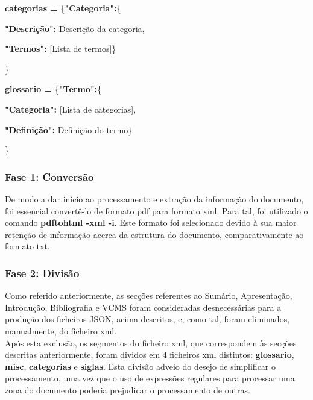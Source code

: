 \begin{center}
    \textbf{categorias =}
    \{\textbf{"Categoria":}\{
\end{center}
\begin{center}
    \textbf{"Descrição":}
    {Descrição da categoria},
\end{center}
\begin{center}
    \textbf{"Termos":}
    {[Lista de termos]}\}
\end{center}
\}

\begin{center}
    \textbf{glossario =}
    \{\textbf{"Termo":}\{
\end{center}
\begin{center}
    \textbf{"Categoria":}
    {[Lista de categorias]},
\end{center}
\begin{center}
    \textbf{"Definição":}
    {Definição do termo}\}
\end{center}
\}

\subsubsection{Fase 1: Conversão}

De modo a dar início ao processamento e extração da informação do documento, foi essencial convertê-lo de formato pdf para formato xml. Para tal, foi utilizado o comando \textbf{pdftohtml -xml -i}. Este formato foi selecionado devido à sua maior retenção de informação acerca da estrutura do documento, comparativamente ao formato txt.

\subsubsection{Fase 2: Divisão}

Como referido anteriormente, as secções referentes ao Sumário, Apresentação, Introdução, Bibliografia e VCMS foram consideradas desnecessárias para a produção dos ficheiros JSON, acima descritos, e, como tal, foram eliminados, manualmente, do ficheiro xml. \\

Após esta exclusão, os segmentos do ficheiro xml, que correspondem às secções descritas anteriormente, foram dividos em 4 ficheiros xml distintos: \textbf{glossario}, \textbf{misc}, \textbf{categorias} e \textbf{siglas}. Esta divisão adveio do desejo de simplificar o processamento, uma vez que o uso de expressões regulares para processar uma zona do documento poderia prejudicar o processamento de outras. 

